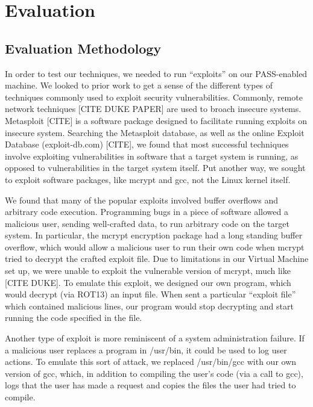 \documentclass[10pt,twocolumn]{article}
\begin{document}
%

\section{Evaluation}

\subsection{Evaluation Methodology}
In order to test our techniques, we needed to run “exploits” on our PASS-enabled machine. We looked to prior work to get a sense of the different types of techniques commonly used to exploit security vulnerabilities. Commonly, remote network techniques [CITE DUKE PAPER] are used to broach insecure systems. Metasploit [CITE] is a software package designed to facilitate running exploits on insecure system. Searching the Metasploit database, as well as the online Exploit Database (exploit-db.com) [CITE], we found that most successful techniques involve exploiting vulnerabilities in software that a target system is running, as opposed to vulnerabilities in the target system itself. Put another way, we sought to exploit software packages, like mcrypt and gcc, not the Linux kernel itself. 

We found that many of the popular exploits involved buffer overflows and arbitrary code execution. Programming bugs in a piece of software allowed a malicious user, sending well-crafted data, to run arbitrary code on the target system. In particular, the mcrypt encryption package had a long standing buffer overflow, which would allow a malicious user to run their own code when mcrypt tried to decrypt the crafted exploit file. Due to limitations in our Virtual Machine set up, we were unable to exploit the vulnerable version of mcrypt, much like [CITE DUKE]. To emulate this exploit, we designed our own program, which would decrypt (via ROT13) an input file. When sent a particular “exploit file” which contained malicious lines, our program would stop decrypting and start running the code specified in the file.

Another type of exploit is more reminiscent of a system administration failure. If a malicious user replaces a program in /usr/bin, it could be used to log user actions. To emulate this sort of attack, we replaced /usr/bin/gcc with our own version of gcc, which, in addition to compiling the user’s code (via a call to gcc), logs that the user has made a request and copies the files the user had tried to compile. 
\end{document}
